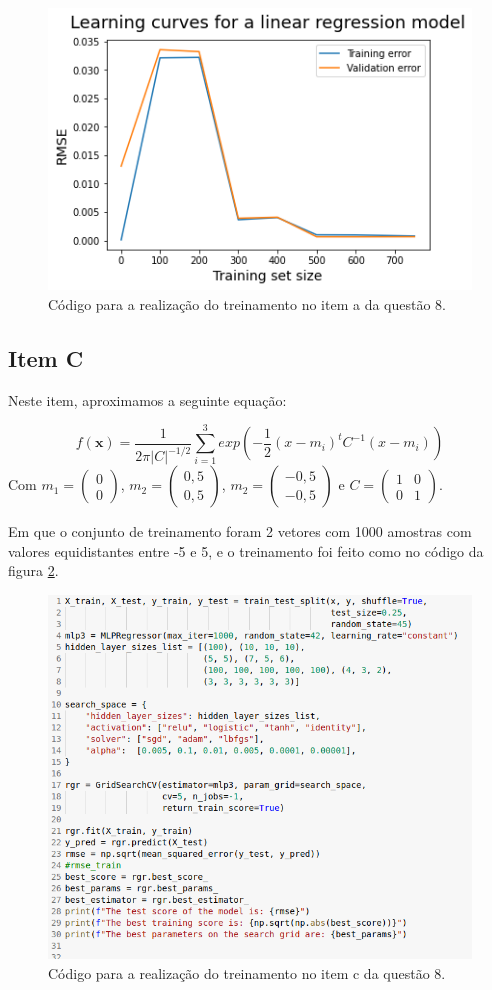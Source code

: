 \documentclass[a4paper, 12pt]{article}
\begin{document}
\begin{figure}[h]
	\centering
 	\includegraphics[width=0.5\linewidth]{figuras/quest8b_curve.png}
    \caption{Código para a realização do treinamento no item a da questão 8.}
    \label{fig:quest8b_curva}
\end{figure}
\FloatBarrier

\subsection{Item C}

Neste item, aproximamos a seguinte equação:

\begin{equation}
    f(\textbf{x}) = \frac{1}{2\pi |C|^{-1/2}}\sum\limits_{i=1}^{3} exp\left( -\frac{1}{2}  (x - m_i) ^t C^{-1} (x-m_i)\right) 
\end{equation}
Com $m_1= \begin{pmatrix} 0 \\ 0 \end{pmatrix}$,  $m_2= \begin{pmatrix} 0,5 \\ 0,5 \end{pmatrix}$, $m_2= \begin{pmatrix} -0,5 \\ -0,5 \end{pmatrix}$ e $C= \begin{pmatrix} 1 & 0 \\ 0 & 1 \end{pmatrix}$.

Em que o conjunto de treinamento foram 2 vetores com 1000 amostras com valores equidistantes entre -5 e 5, e o treinamento foi feito como no código da figura \ref{fig:quest8c_code}.

\begin{figure}[h]
	\centering
 	\includegraphics[width=0.6\linewidth]{figuras/quest8c_codigo.png}
    \caption{Código para a realização do treinamento no item c da questão 8.}
    \label{fig:quest8c_code}
\end{figure}
\FloatBarrier
\end{document}
